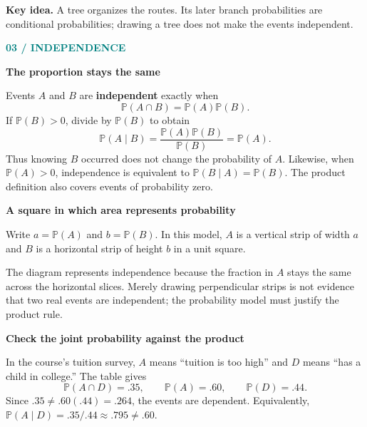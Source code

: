 \documentclass[11pt,letterpaper]{article}
\newcommand{\Pp}{\mathbb{P}}
\newcommand{\sectionpage}[2]{\textcolor{teal}{\small\textbf{#1}}\par{\LARGE\bfseries\color{ink}#2}\par\medskip}
\newcommand{\takeaway}[1]{\par\smallskip\noindent\colorbox{pale}{\parbox{\dimexpr\linewidth-2\fboxsep\relax}{\textbf{Key idea.} #1}}\par\smallskip}
\newcommand{\minihead}[1]{\par\smallskip\textbf{\color{ink}#1}\par}
\begin{document}
\takeaway{A tree organizes the routes. Its later branch probabilities are conditional probabilities; drawing a tree does not make the events independent.}

\newpage
\sectionpage{03 / INDEPENDENCE}{The proportion stays the same}
Events $A$ and $B$ are \textbf{independent} exactly when
\[
\boxed{\Pp(A\cap B)=\Pp(A)\Pp(B).}
\]
If $\Pp(B)>0$, divide by $\Pp(B)$ to obtain
\[
\Pp(A\mid B)=\frac{\Pp(A)\Pp(B)}{\Pp(B)}=\Pp(A).
\]
Thus knowing $B$ occurred does not change the probability of $A$. Likewise, when $\Pp(A)>0$, independence is equivalent to $\Pp(B\mid A)=\Pp(B)$. The product definition also covers events of probability zero.

\minihead{A square in which area represents probability}
Write $a=\Pp(A)$ and $b=\Pp(B)$. In this model, $A$ is a vertical strip of width $a$ and $B$ is a horizontal strip of height $b$ in a unit square.
\begin{center}
\end{center}
The diagram represents independence because the fraction in $A$ stays the same across the horizontal slices. Merely drawing perpendicular strips is not evidence that two real events are independent; the probability model must justify the product rule.

\minihead{Check the joint probability against the product}
In the course's tuition survey, $A$ means ``tuition is too high'' and $D$ means ``has a child in college.'' The table gives
\[
\Pp(A\cap D)=.35,\qquad\Pp(A)=.60,\qquad\Pp(D)=.44.
\]
Since $.35\ne .60(.44)=.264$, the events are dependent. Equivalently, $\Pp(A\mid D)=.35/.44\approx .795\ne .60$.
\end{document}
